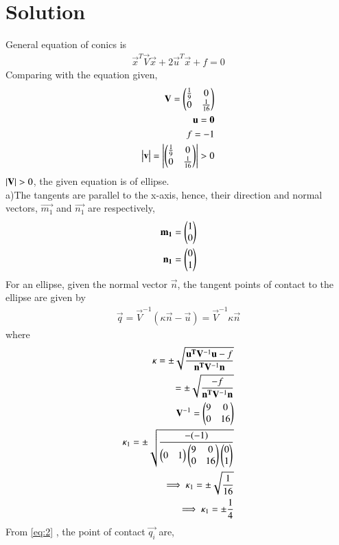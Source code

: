 \documentclass[journal,12pt,twocolumn]{IEEEtran}
\begin{document}
\section{Solution}
General equation of conics is 
\begin{align}
    \vec{x}^T\vec{V}\vec{x}+ 2\vec{u}^T\vec{x}+f = 0
    \label{eq:1}
\end{align}
Comparing with the equation given,
\begin{align}
\mathbf{V}=\begin{pmatrix}\frac{1}{9} & 0 \\ 0 & \frac{1}{16}\end{pmatrix}\\
\mathbf{u}=\mathbf{0}\\
f=-1\\
\begin{vmatrix}\mathbf{v}\end{vmatrix}=\begin{vmatrix}\begin{pmatrix}\frac{1}{9} & 0 \\ 0 & \frac{1}{16}\end{pmatrix}\end{vmatrix}>0
\end{align}
\because $\left\vert\mathbf{V}\right\vert>0$, the given equation is of ellipse.\\
a)The tangents are parallel to the x-axis, hence, their direction and normal vectors, $\vec{m_1}$ and $\vec{n_1}$ are respectively,
\begin{align}
\mathbf{m_1}=\begin{pmatrix}1\\0\end{pmatrix}\\
\mathbf{n_1}=\begin{pmatrix}0\\1\end{pmatrix}
\end{align}
For an ellipse, given the normal vector $\vec{n}$, the tangent points of contact to the ellipse are given by
\begin{align}
    \vec{q}=\vec{V}^{-1}(\kappa \vec{n}-\vec{u})
    \label{eq:2}
    =\vec{V}^{-1}\kappa \vec{n}
\end{align}
where
\begin{align}
    \kappa=\pm \sqrt{\frac{\mathbf{u^T}\mathbf{V}^{-1}\mathbf{u}-f}{\mathbf{n^T}\mathbf{V}^{-1}\mathbf{n}}}
    \label{eq:2.0.9}\\
   =\pm \sqrt{\frac{-f}{\mathbf{n^T}\mathbf{V}^{-1}\mathbf{n}}}\\
    \mathbf{V}^{-1}=\begin{pmatrix}9 & 0 \\ 0 & 16\end{pmatrix}\\
    \kappa_1=\pm \sqrt{\frac{-(-1)}{\begin{pmatrix}0 & 1\end{pmatrix}\begin{pmatrix}9 & 0 \\ 0 & 16\end{pmatrix} \begin{pmatrix}0\\1\end{pmatrix}}}\\
 \implies \kappa_1=\pm \sqrt{\frac{1}{16}}\\
    \implies \kappa_1=\pm \frac{1}{4}      
\end{align}
From \eqref{eq:2} , the point of contact $\vec{q_i}$ are,
\end{document}
